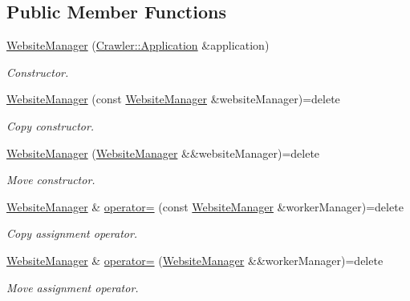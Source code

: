 \subsection*{Public Member Functions}
\begin{DoxyCompactItemize}
\item 
\hyperlink{class_crawler_1_1_website_manager_a5a030384d9b5f0adf15a1d051256c5fe}{Website\+Manager} (\hyperlink{class_crawler_1_1_application}{Crawler\+::\+Application} \&application)
\begin{DoxyCompactList}\small\item\em Constructor. \end{DoxyCompactList}\item 
\hyperlink{class_crawler_1_1_website_manager_a7c1715be3c86c226503202021bfc855d}{Website\+Manager} (const \hyperlink{class_crawler_1_1_website_manager}{Website\+Manager} \&website\+Manager)=delete
\begin{DoxyCompactList}\small\item\em Copy constructor. \end{DoxyCompactList}\item 
\hyperlink{class_crawler_1_1_website_manager_ae0ab13041fef6aa04601c739ae6dd02e}{Website\+Manager} (\hyperlink{class_crawler_1_1_website_manager}{Website\+Manager} \&\&website\+Manager)=delete
\begin{DoxyCompactList}\small\item\em Move constructor. \end{DoxyCompactList}\item 
\hyperlink{class_crawler_1_1_website_manager}{Website\+Manager} \& \hyperlink{class_crawler_1_1_website_manager_aefc1b9366f71d46c98fdafdf104c6d8a}{operator=} (const \hyperlink{class_crawler_1_1_website_manager}{Website\+Manager} \&worker\+Manager)=delete
\begin{DoxyCompactList}\small\item\em Copy assignment operator. \end{DoxyCompactList}\item 
\hyperlink{class_crawler_1_1_website_manager}{Website\+Manager} \& \hyperlink{class_crawler_1_1_website_manager_ad7402de1b8bfb1b587ed6485242541a7}{operator=} (\hyperlink{class_crawler_1_1_website_manager}{Website\+Manager} \&\&worker\+Manager)=delete
\begin{DoxyCompactList}\small\item\em Move assignment operator. \end{DoxyCompactList}\item 

\end{DoxyCompactItemize}
